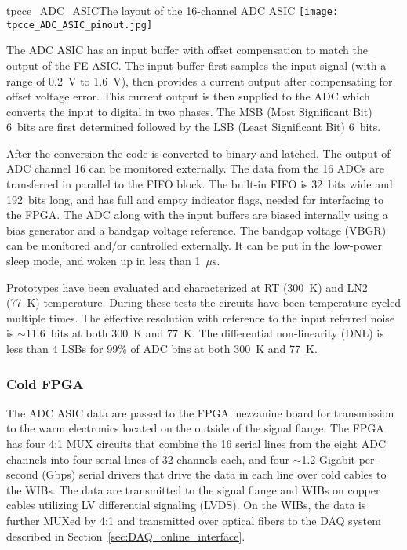 \begin{cdrfigure}{tpcce_ADC_ASIC}{The layout of the 16-channel ADC ASIC}
\texttt{[image: tpcce\_ADC\_ASIC\_pinout.jpg]} %
\end{cdrfigure}

The ADC ASIC has an input buffer with offset compensation to match the output of the FE ASIC.
The input buffer first samples the input signal (with a range of 0.2~V to 1.6~V),
then provides a current output after compensating for offset voltage error.
This current output is then supplied to the ADC which converts the input to digital in two phases.
The MSB (Most Significant Bit) 6~bits are first determined followed by the LSB (Least Significant Bit) 6~bits.

After the conversion the code is converted to binary and latched.
The output of ADC channel 16 can be monitored externally.
The data from the 16 ADCs are transferred in parallel to the FIFO block.
The built-in FIFO is 32~bits wide and 192~bits long,
and has full and empty indicator flags, needed for interfacing to the FPGA.
The ADC along with the input buffers are biased internally using a bias generator and a bandgap voltage reference.
The bandgap voltage (VBGR) can be monitored and/or controlled externally.
It can be put in the low-power sleep mode, and woken up in less than 1~$\mu$s.

Prototypes have been evaluated and characterized at RT (300~K) and LN2 (77~K) temperature.
During these tests the circuits have been temperature-cycled multiple times.
The effective resolution with reference to the input referred noise is $\sim$11.6~bits at both 300~K and 77~K.
The differential non-linearity (DNL) is less than 4 LSBs for 99\% of ADC bins at both 300~K and 77~K.

\subsubsection{Cold FPGA}

The ADC ASIC data are passed to the FPGA mezzanine board for transmission to the warm electronics
located on the outside of the signal flange.
The FPGA has four 4:1 MUX circuits that combine the 16 serial lines from the eight ADC
channels into four serial lines of 32 channels each, and 
four $\sim$1.2 Gigabit-per-second (Gbps) serial drivers that drive the data in each
line over cold cables to the WIBs.
The data are transmitted to the signal flange and WIBs on copper cables utilizing LV differential signaling (LVDS).
On the WIBs, the data is further MUXed by 4:1 and transmitted over optical
fibers to the DAQ system described in Section~\ref{sec:DAQ_online_interface}.

